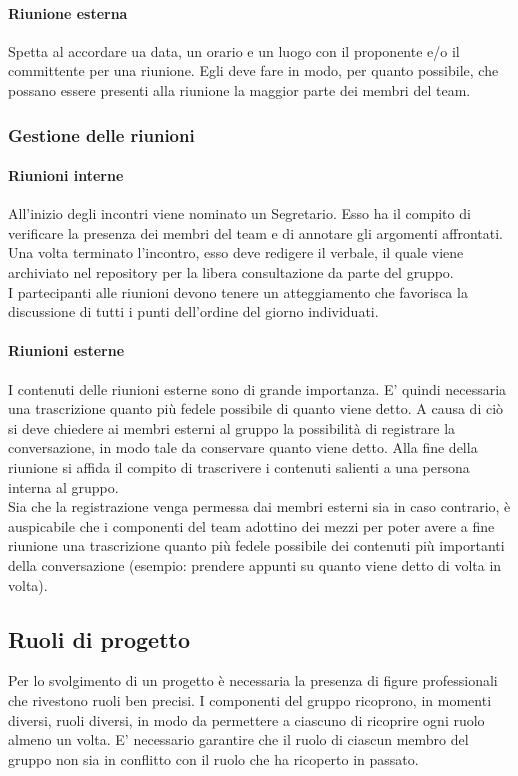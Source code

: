 			\paragraph{Riunione esterna}
				Spetta al  accordare ua data, un orario e un luogo con il proponente e/o il committente per una riunione. Egli deve fare in modo, per quanto possibile, che possano essere presenti alla riunione la maggior parte dei membri del team.
		\subsubsection{Gestione delle riunioni}
			\paragraph{Riunioni interne}
				All'inizio degli incontri viene nominato un Segretario. Esso ha il compito di verificare la presenza dei membri del team e di annotare gli argomenti affrontati. Una volta terminato l'incontro, esso deve redigere il verbale, il quale viene archiviato nel repository per la libera consultazione da parte del gruppo.\\
				I partecipanti alle riunioni devono tenere un atteggiamento che favorisca la discussione di tutti i punti dell'ordine del giorno individuati.
			\paragraph{Riunioni esterne}
				I contenuti delle riunioni esterne sono di grande importanza. E' quindi necessaria una trascrizione quanto più fedele possibile di quanto viene detto. A causa di ciò si deve chiedere ai membri esterni al gruppo la possibilità di registrare la conversazione, in modo tale da conservare quanto viene detto. Alla fine della riunione si affida il compito di trascrivere i contenuti salienti a una persona interna al gruppo.\\
				Sia che la registrazione venga permessa dai membri esterni sia in caso contrario, è auspicabile che i componenti del team adottino dei mezzi per poter avere a fine riunione una trascrizione quanto più fedele possibile dei contenuti più importanti della conversazione (esempio: prendere appunti su quanto viene detto di volta in volta).
	\subsection{Ruoli di progetto}
		Per lo svolgimento di un progetto è necessaria la presenza di figure professionali che rivestono ruoli ben precisi. I componenti del gruppo ricoprono, in momenti diversi, ruoli diversi, in modo da permettere a ciascuno di ricoprire ogni ruolo almeno un volta. E' necessario garantire che il ruolo di ciascun membro del gruppo non sia in conflitto con il ruolo che ha ricoperto in passato.
